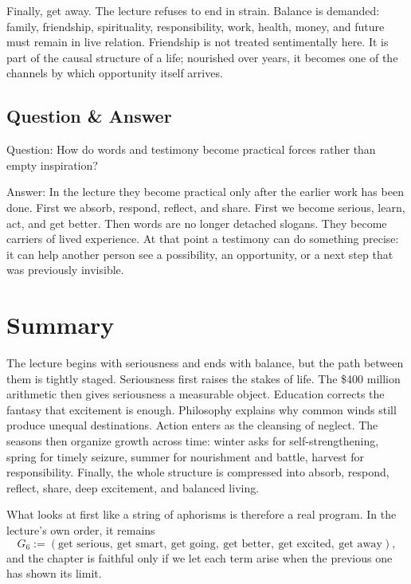Finally, get away. The lecture refuses to end in strain. Balance is demanded: family, friendship, spirituality, responsibility, work, health, money, and future must remain in live relation. Friendship is not treated sentimentally here. It is part of the causal structure of a life; nourished over years, it becomes one of the channels by which opportunity itself arrives.

\subsection{Question \& Answer}

Question: How do words and testimony become practical forces rather than empty inspiration?

Answer: In the lecture they become practical only after the earlier work has been done. First we absorb, respond, reflect, and share. First we become serious, learn, act, and get better. Then words are no longer detached slogans. They become carriers of lived experience. At that point a testimony can do something precise: it can help another person see a possibility, an opportunity, or a next step that was previously invisible.

\section{Summary}

The lecture begins with seriousness and ends with balance, but the path between them is tightly staged. Seriousness first raises the stakes of life. The \$400 million arithmetic then gives seriousness a measurable object. Education corrects the fantasy that excitement is enough. Philosophy explains why common winds still produce unequal destinations. Action enters as the cleansing of neglect. The seasons then organize growth across time: winter asks for self-strengthening, spring for timely seizure, summer for nourishment and battle, harvest for responsibility. Finally, the whole structure is compressed into absorb, respond, reflect, share, deep excitement, and balanced living.

What looks at first like a string of aphorisms is therefore a real program. In the lecture's own order, it remains
\begin{equation}
G_6 := (\text{get serious},\ \text{get smart},\ \text{get going},\ \text{get better},\ \text{get excited},\ \text{get away}),
\end{equation}
and the chapter is faithful only if we let each term arise when the previous one has shown its limit.
